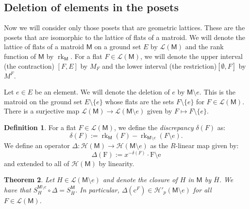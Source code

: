 \documentclass[12pt,letterpaper,english]{amsart}
\theoremstyle{teoremas}
\newtheorem{theorem}{Theorem}[section]
\theoremstyle{definition}
\newtheorem{definition}[theorem]{Definition}
\newcommand{\M}{\mathsf{M}}
\newcommand{\rank}{\operatorname{rk}}
\newcommand{\cH}{\mathcal{H}}
\newcommand{\calL}{\mathcal{L}}
\newcommand{\Ebasis}[1]{\mathrm{#1}}
\newcommand{\Cbasis}[1]{\mathrm{c}^{#1}}
\begin{document}
\subsection{Deletion of elements in the posets}
Now we will consider only those posets that are geometric lattices.
These are the posets that are isomorphic to the lattice of flats of a matroid.
We will denote the lattice of flats of a matroid \(\M\) on a ground set \(E\) by \(\mathcal{L}(\M)\)
and the rank function of \(\M\) by \(\rank_{\M}\).
For a flat \(F \in \mathcal{L}(\M)\), we will denote the upper interval (the contraction)
\([F, E]\) by \(M_F\) and the lower interval (the restriction)\([\emptyset, F]\) by \(M^F\).

Let \(e\in E\) be an element.
We will denote the deletion of \(e\) by \(\M \setminus e\). This is the matroid on the ground set \(E \setminus \{e\}\)
whose flats are the sets \(F \setminus \{e\}\) for \(F \in \mathcal{L}(\M)\).
There is a surjective map \(\calL(\M)\to\calL(\M\setminus e)\) given by \(F \mapsto F \setminus \{e\}\).

\begin{definition}
    For a flat \(F \in \calL(\M)\), we define the \emph{discrepancy} \(\delta(F)\) as:
    \[ \delta(F) := \rank_{\M}(F) - \rank_{\M\setminus e}(F \setminus e). \]
    We define an operator \(\Delta: \cH(\M) \to \cH(\M\setminus e)\) as the \(R\)-linear map given by:
    \[ \Delta(\Ebasis{F}) := x^{-\delta(F)} \cdot \Ebasis{F \setminus e}\]
    and extended to all of \(\cH(\M)\) by linearity.
\end{definition}

\begin{theorem}
    Let \(H \in \calL(\M \setminus e)\) and denote the closure of \(H\) in \(\M\)
    by \(\overline{H}\).
    We have that \(S^{\M\setminus e}_H \circ \Delta =
    S^{\M}_{\overline{H}}\).
    In particular, \(\Delta(\Cbasis{F}) \in \cH'_p(\M \setminus e)\) for all \(F \in \calL(\M)\).
\end{theorem}
\end{document}
